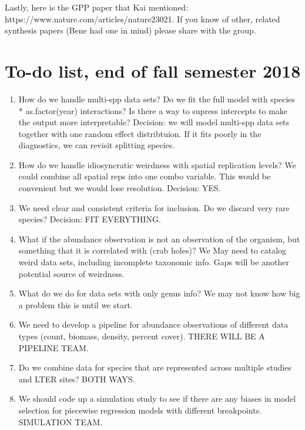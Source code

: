 \documentclass{article}
\begin{document}
Lastly, here is the GPP paper that Kai mentioned: https://www.nature.com/articles/nature23021. If you know of other, related synthesis papers (Bene had one in mind) please share with the group. 

\section{To-do list, end of fall semester 2018}
\begin{enumerate}

\item{How do we handle multi-spp data sets? Do we fit the full model with species * as.factor(year) interactions? Is there a way to supress intercepts to make the output more interpretable? Decision: we will model multi-spp data sets together with one random effect distribtuion. If it fits poorly in the diagnostics, we can revisit splitting species.}

\item{How do we handle idiosyncratic weirdness with spatial replication levels? We could combine all spatial reps into one combo variable. This would be convenient but we would lose resolution. Decision: YES.}

\item{We need clear and consistent criteria for inclusion. Do we discard very rare species? Decision: FIT EVERYTHING. }

\item{What if the abundance observation is not an observation of the organism, but something that it is correlated with (crab holes)?  We May need to catalog weird data sets, including incomplete taxonomic info. Gaps will be another potential source of weirdness.}

\item{What do we do for data sets with only genus info? We may not know how big a problem this is until we start.}

\item{We need to develop a pipeline for abundance observations of different data types (count, biomass, density, percent cover). THERE WILL BE A PIPELINE TEAM.}

\item{Do we combine data for species that are represented across multiple studies and LTER sites? BOTH WAYS.}

\item{We should code up a simulation study to see if there are any biases in model selection for piecewise regression models with different breakpoints. SIMULATION TEAM.}


\end{enumerate}
\end{document}
